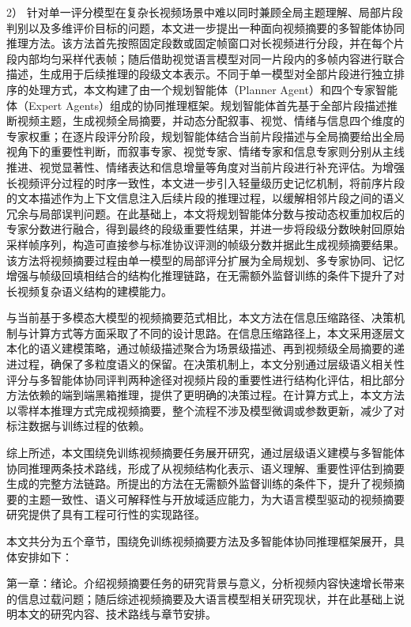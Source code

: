 2） 针对单一评分模型在复杂长视频场景中难以同时兼顾全局主题理解、局部片段判别以及多维评价目标的问题，本文进一步提出一种面向视频摘要的多智能体协同推理方法。该方法首先按照固定段数或固定帧窗口对长视频进行分段，并在每个片段内部均匀采样代表帧；随后借助视觉语言模型对同一片段内的多帧内容进行联合描述，生成用于后续推理的段级文本表示。不同于单一模型对全部片段进行独立排序的处理方式，本文构建了由一个规划智能体（Planner Agent）和四个专家智能体（Expert Agents）组成的协同推理框架。规划智能体首先基于全部片段描述推断视频主题，生成视频全局摘要，并动态分配叙事、视觉、情绪与信息四个维度的专家权重；在逐片段评分阶段，规划智能体结合当前片段描述与全局摘要给出全局视角下的重要性判断，而叙事专家、视觉专家、情绪专家和信息专家则分别从主线推进、视觉显著性、情绪表达和信息增量等角度对当前片段进行补充评估。为增强长视频评分过程的时序一致性，本文进一步引入轻量级历史记忆机制，将前序片段的文本描述作为上下文信息注入后续片段的推理过程，以缓解相邻片段之间的语义冗余与局部误判问题。在此基础上，本文将规划智能体分数与按动态权重加权后的专家分数进行融合，得到最终的段级重要性结果，并进一步将段级分数映射回原始采样帧序列，构造可直接参与标准协议评测的帧级分数并据此生成视频摘要结果。该方法将视频摘要过程由单一模型的局部评分扩展为全局规划、多专家协同、记忆增强与帧级回填相结合的结构化推理链路，在无需额外监督训练的条件下提升了对长视频复杂语义结构的建模能力。

与当前基于多模态大模型的视频摘要范式相比，本文方法在信息压缩路径、决策机制与计算方式等方面采取了不同的设计思路。在信息压缩路径上，本文采用逐层文本化的语义建模策略，通过帧级描述聚合为场景级描述、再到视频级全局摘要的递进过程，确保了多粒度语义的保留。在决策机制上，本文分别通过层级语义相关性评分与多智能体协同评判两种途径对视频片段的重要性进行结构化评估，相比部分方法依赖的端到端黑箱推理，提供了更明确的决策过程。在计算方式上，本文方法以零样本推理方式完成视频摘要，整个流程不涉及模型微调或参数更新，减少了对标注数据与训练过程的依赖。

综上所述，本文围绕免训练视频摘要任务展开研究，通过层级语义建模与多智能体协同推理两条技术路线，形成了从视频结构化表示、语义理解、重要性评估到摘要生成的完整方法链路。所提出的方法在无需额外监督训练的条件下，提升了视频摘要的主题一致性、语义可解释性与开放域适应能力，为大语言模型驱动的视频摘要研究提供了具有工程可行性的实现路径。


本文共分为五个章节，围绕免训练视频摘要方法及多智能体协同推理框架展开，具体安排如下：

第一章：绪论。介绍视频摘要任务的研究背景与意义，分析视频内容快速增长带来的信息过载问题；随后综述视频摘要及大语言模型相关研究现状，并在此基础上说明本文的研究内容、技术路线与章节安排。

